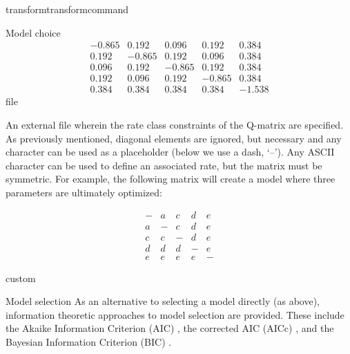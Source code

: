 \begin{command}{transform}{transformcommand}
\begin{arguments}
\begin {argumentgroup} {Model choice}
{                \begin{equation*}
                    \begin{array}{rrrrr}
                        -0.865 &  0.192 &  0.096 &  0.192 &  0.384 \\
                         0.192 & -0.865 &  0.192 &  0.096 &  0.384 \\
                         0.096 &  0.192 & -0.865 &  0.192 &  0.384 \\
                         0.192 &  0.096 &  0.192 & -0.865 &  0.384 \\
                         0.384 &  0.384 &  0.384 &  0.384 & -1.538
                     \end{array}
                \end{equation*} }
                {file}

                {An external file wherein the rate class constraints of
                the Q-matrix are specified. As previously mentioned,
                diagonal elements are ignored, but necessary and any character can
                be used as a placeholder (below we use a dash, `--'). Any
                ASCII character can be used to define an associated
                rate, but the matrix must be symmetric. For example, the
                following matrix will create a model where three
                parameters are ultimately optimized:

                \begin{equation*}
                    \begin{array}{ccccc}
                        - & a & c & d & e \\
                        a & - & c & d & e \\
                        c & c & - & d & e \\
                        d & d & d & - & e \\
                        e & e & e & e & -
                     \end{array}
                \end{equation*}

              
                }
                {custom}

        \end{argumentgroup}
 
 
        \begin {argumentgroup}{Model selection}        
            As an alternative to selecting a model directly (as above), information 
            theoretic approaches to model selection are provided.
            These include the Akaike Information Criterion (AIC)
            \cite{akaike1973}, the corrected AIC (AICc)
            \cite{sugiura1978}, and the Bayesian Information Criterion (BIC)
            \cite{schwarz1978}.
            

\end{argumentgroup}
\end{arguments}
\end{command}
